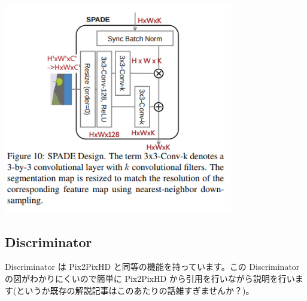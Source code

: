\documentclass[a4paper, dvipdfmx, 10pt]{article}
\begin{document}
\begin{center}
\includegraphics[width=10cm]{./spade.png}
\end{center}

\subsection{Discriminator}
\label{sec:org1e0d1ac}
Discriminator は Pix2PixHD と同等の機能を持っています。この Discriminator の図がわかりにくいので簡単に Pix2PixHD から引用を行いながら説明を行います(というか既存の解説記事はこのあたりの話雑すぎませんか？)。\\
\end{document}
